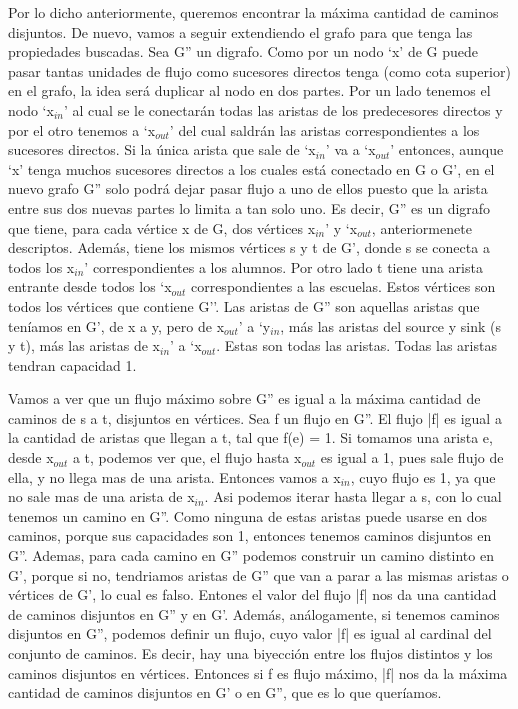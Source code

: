 Por lo dicho anteriormente, queremos encontrar la máxima cantidad de caminos disjuntos. De nuevo, vamos a seguir extendiendo el grafo para que tenga las 
propiedades buscadas. Sea G'' un digrafo.
Como por un nodo `x' de G puede pasar tantas unidades de flujo como sucesores directos tenga (como cota superior) en el grafo, la idea será duplicar al nodo en dos partes. Por un lado tenemos el nodo `x$_{in}$' al cual se le conectarán todas las aristas de los predecesores directos
 y por el otro tenemos a `x$_{out}$' del cual saldrán las aristas correspondientes a los sucesores directos. 
Si la única arista que sale de `x$_{in}$' va a `x$_{out}$' 
entonces, aunque `x' tenga muchos sucesores directos a los cuales está conectado en G o G', en el nuevo grafo G'' solo podrá dejar pasar flujo a uno de ellos puesto que la arista entre sus dos nuevas partes lo limita a tan solo uno.
Es decir, G'' es un digrafo que tiene, para cada vértice x de G, dos vértices x$_{in}$' y `x$_{out}$, anteriormenete descriptos. Además, tiene los mismos vértices s y t de G', 
donde s se conecta a todos los x$_{in}$' correspondientes a los alumnos. Por otro lado t tiene una arista entrante desde todos los `x$_{out}$ correspondientes a las escuelas. 
Estos vértices son todos los vértices que contiene G''. 
Las aristas de G'' son aquellas aristas que teníamos en G', de x a y, pero de x$_{out}$' a `y$_{in}$, más las aristas del source y sink (s y t), más las aristas de x$_{in}$' a `x$_{out}$. Estas son todas las aristas.
Todas las aristas tendran capacidad 1.

\par{Vamos a ver que un flujo máximo sobre G'' es igual a la máxima cantidad de caminos de s a t, disjuntos en vértices.
Sea f un flujo en G''. El flujo |f| es igual a la cantidad de aristas que llegan a t, tal que f(e) = 1. Si tomamos una arista e, desde x$_{out}$ a t, podemos ver que, el flujo
hasta x$_{out}$ es igual a 1, pues sale flujo de ella, y no llega mas de una arista. Entonces vamos a x$_{in}$, cuyo flujo es 1, ya que no sale mas de una arista de x$_{in}$.
Asi podemos iterar hasta llegar a s, con lo cual tenemos un camino en G''. Como ninguna de estas aristas puede usarse en dos caminos, porque sus capacidades son 1,
entonces tenemos caminos disjuntos en G''. Ademas, para cada camino en G'' podemos construir un camino distinto en G', porque si no, tendriamos aristas de G'' que van a parar a las mismas aristas o vértices de G', lo cual es falso. 
Entones el valor del flujo |f| nos da una cantidad de caminos disjuntos en G'' y en G'. 
Además, análogamente, si tenemos caminos disjuntos en G'', podemos definir un flujo, cuyo valor |f| es igual al cardinal del conjunto de caminos. Es decir, hay una biyección entre
los flujos distintos y los caminos disjuntos en vértices.
Entonces si f es flujo máximo, |f| nos da la máxima cantidad de caminos disjuntos en G' o en G'', que es lo que queríamos. }

